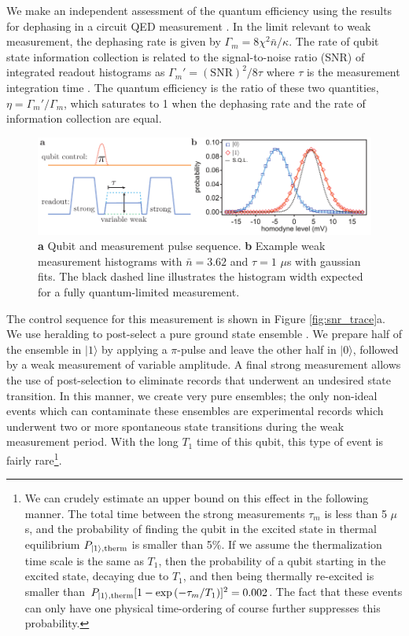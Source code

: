 We make an independent assessment of the quantum efficiency using the results for dephasing in a circuit QED measurement \cite{Boissonneault2009}.  In the limit relevant to weak measurement, the dephasing rate is given by $\Gamma_m = 8 \chi^2 \bar{n} / \kappa$.  The rate of qubit state information collection is related to the signal-to-noise ratio (SNR) of integrated readout histograms as $\Gamma_m' = (\textrm{SNR})^2 / 8 \tau$ where $\tau$ is the measurement integration time \cite{Korotkov2001}.  The quantum efficiency is the ratio of these two quantities, $\eta = \Gamma_m' / \Gamma_m$, which saturates to 1 when the dephasing rate and the rate of information collection are equal.

\begin{figure}
\begin{center}
\includegraphics[width=6in]{twpa_exp/weak_meas}
\end{center}
\caption[Weak measurement extraction of $\eta$]{\textbf{a} Qubit and measurement pulse sequence.  \textbf{b} Example weak measurement histograms with $\bar{n} = 3.62$ and $\tau = 1$ $\mu$s with gaussian fits.  The black dashed line illustrates the histogram width expected for a fully quantum-limited measurement.}
\label{fig:weak_meas}
\end{figure}

The control sequence for this measurement is shown in Figure \ref{fig:snr_trace}a.  We use heralding to post-select a pure ground state ensemble \cite{fluxqb}.  We prepare half of the ensemble in $|1\rangle$ by applying a $\pi$-pulse and leave the other half in $|0\rangle$, followed by a weak measurement of variable amplitude.  A final strong measurement allows the use of post-selection to eliminate records that underwent an undesired state transition.  In this manner, we create very pure ensembles; the only non-ideal events which can contaminate these ensembles are experimental records which underwent two or more spontaneous state transitions during the weak measurement period.  With the long $T_1$ time of this qubit, this type of event is fairly rare\footnote{We can crudely estimate an upper bound on this effect in the following manner.  The total time between the strong measurements $\tau_m$ is less than 5 $\mu$s, and the probability of finding the qubit in the excited state in thermal equilibrium $P_{|1\rangle,\mathrm{therm}}$ is smaller than 5\%.  If we assume the thermalization time scale is the same as $T_1$, then the probability of a qubit starting in the excited state, decaying due to $T_1$, and then being thermally re-excited is smaller than $P_{|1\rangle,\mathrm{therm}} [ 1 - \exp{(-\tau_m / T_1)}]^2  = 0.002$.  The fact that these events can only have one physical time-ordering of course further suppresses this probability.}.

